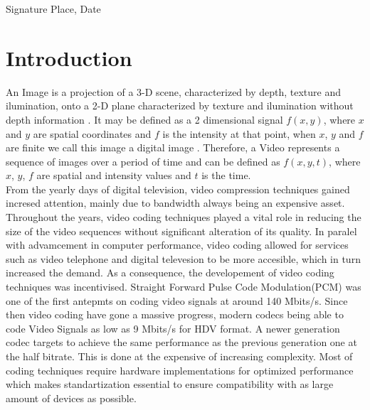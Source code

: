 \documentclass[a4paper,11pt,oneside]{article}
\begin{document}
  \vspace{20mm}

  Signature \hfill Place, Date

  \newpage
  \begin{abstract}
 
  
  \end{abstract}

  
  \clearpage

  \fi

  \newpage
  \tableofcontents

  \newpage
  \listoffigures

  \newpage

  \section{Introduction}
  \indent An Image is a projection of a 3-D scene, characterized by depth, texture and ilumination, onto a 2-D plane characterized by texture and ilumination 
  without depth information \cite[p.~5]{richardson2002video}. It may be defined as a 2 dimensional signal $ f(x, y) $, where $x$ and $y$ are spatial 
  coordinates and $f$ is the intensity at that point, when $x$, $y$ and $f$ are finite we call this image a digital image \cite[p.~1]{gonzalez2008digital}. 
  Therefore, a Video represents a sequence of images over a period of time and can be defined as $f(x,y,t)$, where $x$, $y$, $f$ are spatial and intensity values 
  and $t$ is the time.\\



  \indent From the yearly days of digital television, video compression techniques gained incresed attention, mainly due to bandwidth always being 
  an expensive asset. Throughout the years, video coding techniques played a vital role in reducing the size of the video sequences without significant
  alteration of its quality. In paralel with advamcement in computer performance, video coding allowed for services such as video telephone and digital 
  televesion to be more accesible, which in turn increased the demand. As a consequence, the developement of video coding techniques was incentivised. 
  Straight Forward Pulse Code Modulation(PCM) was one of the first antepmts on coding video signals at around 140 Mbits/s. Since then video coding 
  have gone a massive progress, modern codecs being able to code Video Signals as low as 9 Mbits/s for HDV format. A newer generation codec targets 
  to achieve the same performance as the previous generation one at the half bitrate. This is done at the expensive of increasing complexity. Most of coding
  techniques require hardware implementations for optimized performance which makes standartization essential to ensure compatibility with as large amount of devices 
  as possible.\cite{ghanbari2011standard}
  
\end{document}

